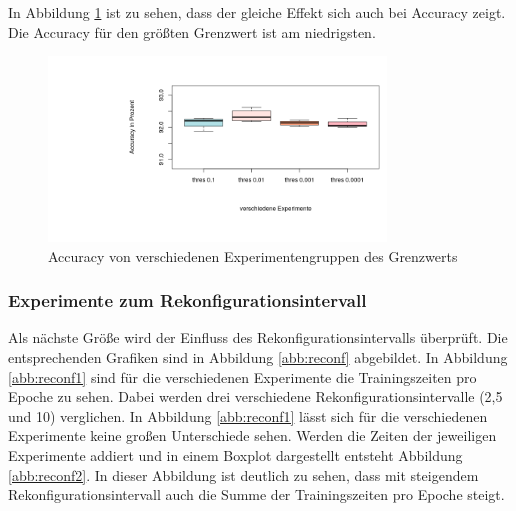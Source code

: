  In Abbildung \ref{abb:lr3} ist zu sehen, dass der gleiche Effekt sich auch bei Accuracy zeigt. Die Accuracy für den größten Grenzwert ist am niedrigsten.
 
 \begin{figure}[h]
 \centering
 \includegraphics[width=0.8\textwidth]{KapitelPartB/Images/thres3.png}
 \caption{Accuracy von verschiedenen Experimentengruppen des Grenzwerts}
 \label{abb:lr3}
 \end{figure}


\subsubsection{Experimente zum Rekonfigurationsintervall}

 Als nächste Größe wird der Einfluss des Rekonfigurationsintervalls überprüft. Die entsprechenden Grafiken sind in Abbildung \ref{abb:reconf} abgebildet. In Abbildung \ref{abb:reconf1} sind für die verschiedenen Experimente die Trainingszeiten pro Epoche zu sehen. Dabei werden drei verschiedene Rekonfigurationsintervalle (2,5 und 10) verglichen. In Abbildung \ref{abb:reconf1} lässt sich für die verschiedenen Experimente keine großen Unterschiede sehen. Werden die Zeiten der jeweiligen Experimente addiert und in einem Boxplot dargestellt entsteht Abbildung \ref{abb:reconf2}. In dieser Abbildung ist deutlich zu sehen, dass mit steigendem Rekonfigurationsintervall auch die Summe der Trainingszeiten pro Epoche steigt.
 
